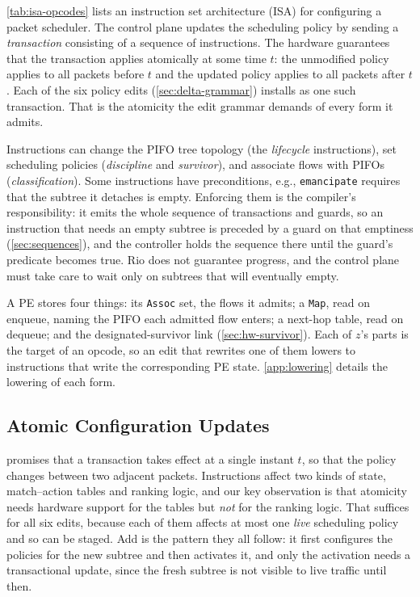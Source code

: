 \documentclass[sigplan,anonymous,review,nonacm]{acmart}
\newcommand{\notation}[1]{\ensuremath{#1}\ifmmode\else\xspace\fi}
\newcommand{\zz}{\notation{\mathit{z}}}
\newcommand{\Add}{\textsf{Add}}
\newcommand{\Quiesce}{\textsf{Quiesce}}
\newcommand{\Remove}{\textsf{Remove}}
\newcommand{\Retire}{\textsf{Retire}}
\begin{document}
\cref{tab:isa-opcodes} lists an instruction set architecture (ISA) for configuring a packet scheduler.
The control plane updates the scheduling policy by sending a \emph{transaction} consisting of a sequence of instructions.
The hardware guarantees that the transaction applies atomically at some time $t$:
the unmodified policy applies to all packets before $t$ and the updated policy applies to all packets after $t$.
Each of the six policy edits (\cref{sec:delta-grammar}) installs as one such transaction.
That is the atomicity the edit grammar demands of every form it admits.

Instructions can change the PIFO tree topology (the \emph{lifecycle} instructions), set scheduling policies (\emph{discipline} and \emph{survivor}), and associate flows with PIFOs (\emph{classification}).
Some instructions have preconditions, e.g., \texttt{emancipate} requires that the subtree it detaches is empty.
Enforcing them is the compiler's responsibility: it emits the whole sequence of transactions and guards, so an instruction that needs an empty subtree is preceded by a guard on that emptiness (\cref{sec:sequences}), and the controller holds the sequence there until the guard's predicate becomes true.
Rio does not guarantee progress, and the control plane must take care to wait only on subtrees that will eventually empty.

A PE stores four things: its \texttt{Assoc} set, the flows it admits; a \texttt{Map}, read on enqueue, naming the PIFO each admitted flow enters; a next-hop table, read on dequeue; and the designated-survivor link (\cref{sec:hw-survivor}).
%
Each of \zz's parts is the target of an opcode, so an edit that rewrites one of them lowers to instructions that write the corresponding PE state.
\cref{app:lowering} details the lowering of each form.

\subsection{Atomic Configuration Updates}
\label{sec:hw-commit}

 promises that a transaction takes effect at a single instant $t$, so that the policy changes between two adjacent packets.
Instructions affect two kinds of state, match--action tables and ranking logic, and our key observation is that atomicity needs hardware support for the tables but \emph{not} for the ranking logic.
That suffices for all six edits, because each of them affects at most one \emph{live} scheduling policy and so can be staged.
\Add{} is the pattern they all follow: it first configures the policies for the new subtree and then activates it, and only the activation needs a transactional update, since the fresh subtree is not visible to live traffic until then.
\end{document}
